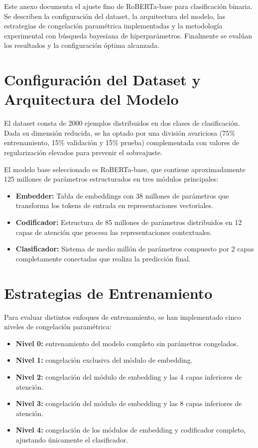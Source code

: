\label{anexo:entrenamiento}
Este anexo documenta el ajuste fino de RoBERTa-base para clasificación binaria. Se describen la configuración del dataset, la arquitectura del modelo, las estrategias de congelación paramétrica implementadas y la metodología experimental con búsqueda bayesiana de hiperparámetros. Finalmente se evalúan los resultados y la configuración óptima alcanzada.

\section{Configuración del Dataset y Arquitectura del Modelo}

El dataset consta de 2000 ejemplos distribuidos en dos clases de clasificación. Dada su dimensión reducida, se ha optado por una división avariciosa (75\% entrenamiento, 15\% validación y 15\% prueba) complementada con valores de regularización elevados para prevenir el sobreajuste.

El modelo base seleccionado es RoBERTa-base, que contiene aproximadamente 125 millones de parámetros estructurados en tres módulos principales:

\begin{itemize}
  \item \textbf{Embedder:} Tabla de embeddings con 38 millones de parámetros que transforma los tokens de entrada en representaciones vectoriales.
  \item \textbf{Codificador:} Estructura de 85 millones de parámetros distribuidos en 12 capas de atención que procesa las representaciones contextuales.
  \item \textbf{Clasificador:} Sistema de medio millón de parámetros compuesto por 2 capas completamente conectadas que realiza la predicción final. 
\end{itemize}

\section{Estrategias de Entrenamiento}

Para evaluar distintos enfoques de entrenamiento, se han implementado cinco niveles de congelación paramétrica:

\begin{itemize}
  \item \textbf{Nivel 0:} entrenamiento del modelo completo sin parámetros congelados.
  \item \textbf{Nivel 1:} congelación exclusiva del módulo de embedding.
  \item \textbf{Nivel 2:} congelación del módulo de embedding y las 4 capas inferiores de atención.
  \item \textbf{Nivel 3:} congelación del módulo de embedding y las 8 capas inferiores de atención.
  \item \textbf{Nivel 4:} congelación de los módulos de embedding y codificador completo, ajustando únicamente el clasificador. 
\end{itemize}

